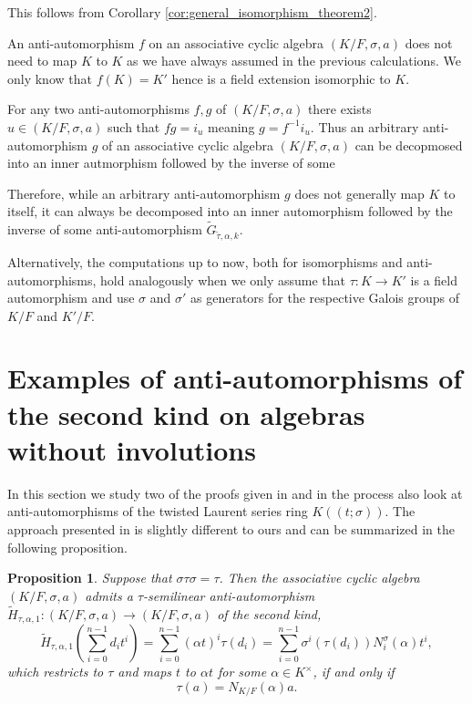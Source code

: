 \documentclass{amsart}
\theoremstyle{plain}
\newtheorem{proposition}[theorem]{Proposition}
\theoremstyle{definition}
\numberwithin{equation}{section}
\numberwithin{figure}{section}
\begin{document}
This follows from Corollary \ref{cor:general_isomorphism_theorem2}.

An anti-automorphism $f$ on an associative cyclic algebra $(K/F,\sigma,a)$  does not need to map $K$ to $K$ as we have always assumed in the previous calculations. 
We only know that $f(K)=K'$ hence is a field extension isomorphic to $K$. 

For any two anti-automorphisms $f,g$ of $(K/F,\sigma,a)$ there exists $u\in  (K/F,\sigma,a)$ such that $fg=i_u$ meaning $g = f^{-1} i_u$.
Thus an arbitrary anti-automorphism $g$ of an associative cyclic algebra $(K/F,\sigma,a)$ can be decopmosed into an inner autmorphism followed by the inverse of some 

 Therefore, while an arbitrary anti-automorphism $g$ does not generally map $K$ to itself, it can always be decomposed into an inner automorphism followed by the inverse of some anti-automorphism $\widetilde G_{\tilde\tau,\alpha,k}$.


Alternatively, the computations up to now, both for isomorphisms and anti-automorphisms, hold analogously when we only assume that $\tau:K\to K'$ is a field automorphism and use $\sigma$ and $\sigma'$ as generators for the respective Galois groups of $K/F$ and $K'/F$.




\section{Examples of anti-automorphisms of the second kind  on algebras without involutions}\label{sec:Pat}

In this section we study two of the proofs given in  \cite{MST} and in the process also look at anti-automorphisms of the twisted Laurent series ring $K((t;\sigma))$. The approach presented in  \cite[Proposition 3.4]{MST} is slightly different to ours and can be summarized in the following proposition.


\begin{proposition}\label{prop:PatGen} 
Suppose that $\sigma\tau\sigma=\tau$.
 Then the associative cyclic algebra $(K/F,\sigma,a)$ admits a $\tau$-semilinear anti-automorphism $\widetilde H_{\tau,\alpha,1}:(K/F,\sigma,a) \to (K/F,\sigma,a)$  of the second kind,
 $$\widetilde H_{\tau,\alpha,1}(\sum_{i=0}^{n-1}d_it^i)=\sum_{i=0}^{n-1}   (\alpha t)^i \tau(d_i)=\sum_{i=0}^{n-1} \sigma^i(\tau(d_i) ) N_i^\sigma(\alpha) t^i,$$
 which restricts to $\tau$ and maps $t$ to $\alpha t$ for some $\alpha\in K^\times$, if and only if
 $$\tau(a)=N_{K/F}(\alpha) a.$$
   \end{proposition}
\end{document}
